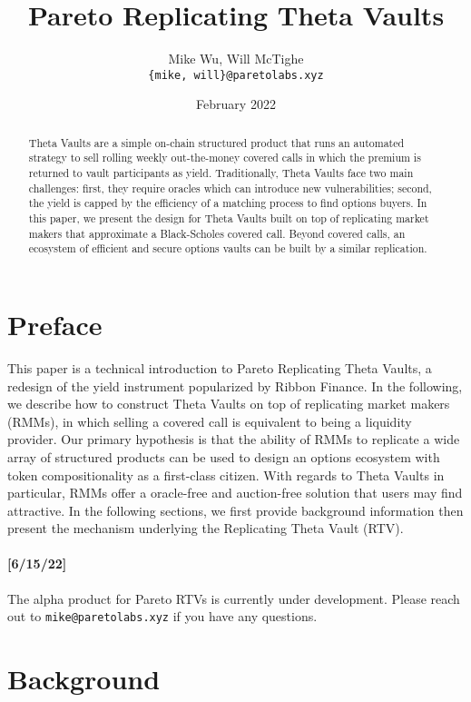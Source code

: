 \documentclass[hidelinks, 12pt]{article}
\title{Pareto Replicating Theta Vaults}
\author{Mike Wu, Will McTighe \\ \small\texttt{\{mike, will\}@paretolabs.xyz}}
\date{February 2022}
\begin{document}
\maketitle

\tableofcontents

\begin{abstract}
Theta Vaults are a simple on-chain structured product that runs an automated strategy to sell rolling weekly out-the-money covered calls in which the premium is returned to vault participants as yield.
Traditionally, Theta Vaults face two main challenges: first, they require oracles which can introduce new vulnerabilities; second, the yield is capped by the efficiency of a matching process to find options buyers.
In this paper, we present the design for Theta Vaults built on top of replicating market makers that approximate a Black-Scholes covered call.
Beyond covered calls, an ecosystem of efficient and secure options vaults can be built by a similar replication.
\end{abstract}

\section{Preface}

This paper is a technical introduction to Pareto Replicating Theta Vaults, a redesign of the yield instrument popularized by Ribbon Finance. In the following, we describe how to construct Theta Vaults on top of replicating market makers (RMMs), in which selling a covered call is equivalent to being a liquidity provider. Our primary hypothesis is that the ability of RMMs to replicate a wide array of structured products can be used to design an options ecosystem with token compositionality as a first-class citizen. With regards to Theta Vaults in particular, RMMs offer a oracle-free and auction-free solution that users may find attractive. In the following sections, we first provide background information then present the mechanism underlying the Replicating Theta Vault (RTV).

\paragraph{[6/15/22]} The alpha product for Pareto RTVs is currently under development. Please reach out to \texttt{mike@paretolabs.xyz} if you have any questions.

\section{Background}
\end{document}
